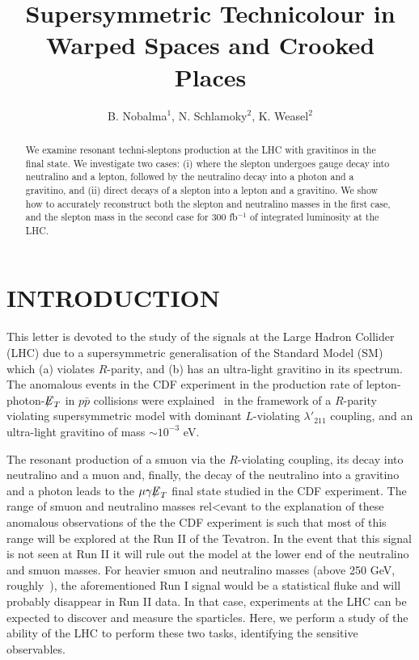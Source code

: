 \documentclass[11pt]{cernrep}
\begin{document}
\title{Supersymmetric Technicolour in Warped Spaces and Crooked
Places}

\author{B. Nobalma$^1$, N. Schlamoky$^2$, K. Weasel$^2$}

\maketitle

\begin{abstract}
We examine resonant techni-sleptons production at the LHC with
gravitinos in the final state. We investigate two cases: (i) where
the slepton undergoes gauge decay into neutralino and a lepton,
followed by the neutralino decay into a photon and a gravitino,
and (ii) direct decays of a slepton into a lepton and a gravitino.
We show how to accurately reconstruct both the slepton and
neutralino masses in the first case, and the slepton mass in the
second case for 300 fb$^{-1}$ of integrated luminosity at the LHC.
\end{abstract}

\section{INTRODUCTION}
This letter is devoted to the study of the signals at the Large Hadron
Collider (LHC) due to a supersymmetric generalisation of the Standard
Model (SM) which (a) violates $R$-parity, and (b) has an ultra-light
gravitino in its spectrum. The anomalous events in the CDF experiment
in the production rate of lepton-photon-${\not\!\!E}_{T}$ in $p{\bar p}$ collisions
were explained~\cite{Belanger:2001fz,Binoth:2005ff,Huston:2011ny}
in the framework of a
$R$-parity violating supersymmetric model with dominant
$L$-violating $\lambda'_{211}$ coupling,
and an ultra-light gravitino of mass $\sim10^{-3}$ eV.

The resonant production of a smuon via the $R$-violating coupling,
its decay into neutralino and a muon and, finally, the decay of the
neutralino into a gravitino and a photon
leads to the $\mu \gamma {\not\!\!E}_{T}$ final state studied in the CDF experiment.
The range of smuon and neutralino masses rel<evant to the explanation of
these
anomalous observations of the the CDF experiment is such that most of
this range will be explored at the Run II of the Tevatron.
In the event
that this signal is not seen at Run II it will rule out the model at
the lower end of the neutralino and smuon masses.
For heavier
smuon and neutralino masses (above 250 GeV, roughly~\cite{Skands:2010ak}), the aforementioned
Run I signal would be a statistical fluke and will probably disappear
in Run II data. In that case, experiments at the LHC can be expected to
discover and measure the sparticles. Here, we perform a
study of the ability of the LHC to perform these two tasks, identifying
the sensitive observables.
\end{document}
